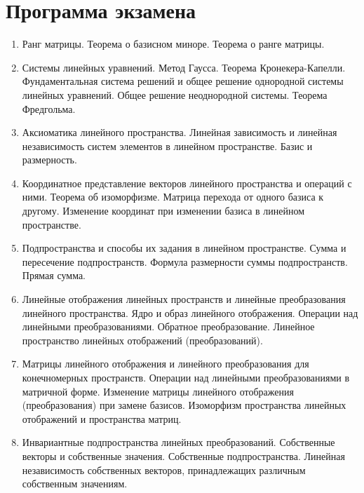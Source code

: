 \section*{Программа экзамена}

\begin{enumerate}[leftmargin=*, wide=0pt]
    \item Ранг матрицы. Теорема о базисном миноре. Теорема о ранге матрицы.
    
    \item Системы линейных уравнений. Метод Гаусса. Теорема Кронекера-Капелли. Фундаментальная система решений и общее решение однородной системы линейных уравнений. Общее решение неоднородной системы. Теорема Фредгольма.
    
    \item Аксиоматика линейного пространства. Линейная зависимость и линейная независимость систем элементов в линейном пространстве. Базис и размерность.
    
    \item Координатное представление векторов линейного пространства и операций с ними. Теорема об изоморфизме. Матрица перехода от одного базиса к другому. Изменение координат при изменении базиса в линейном пространстве.
    
    \item Подпространства и способы их задания в линейном пространстве. Сумма и пересечение подпространств. Формула размерности суммы подпространств. Прямая сумма.
    
    \item Линейные отображения линейных пространств и линейные преобразования линейного пространства. Ядро и образ линейного отображения. Операции над линейными преобразованиями. Обратное преобразование. Линейное пространство линейных отображений (преобразований).
    
    \item Матрицы линейного отображения и линейного преобразования для конечномерных пространств. Операции над линейными преобразованиями в матричной форме. Изменение матрицы линейного отображения (преобразования) при замене базисов. Изоморфизм пространства линейных отображений и пространства матриц.
    
    \item Инвариантные подпространства линейных преобразований. Собственные векторы и собственные значения. Собственные подпространства. Линейная независимость собственных векторов, принадлежащих различным собственным значениям.
    

\end{enumerate}
